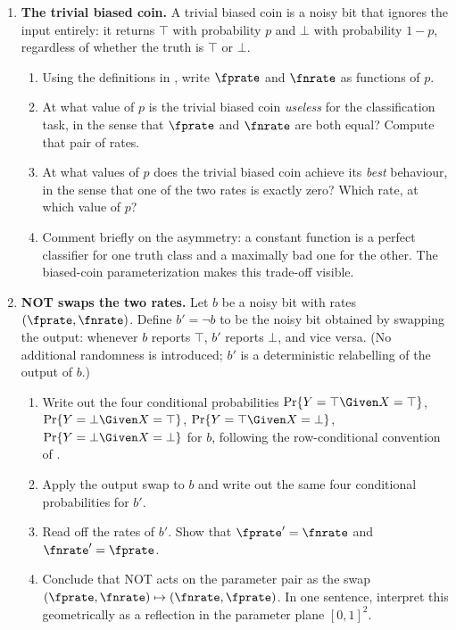 \begin{enumerate}
\item \exstarstar
\label{ex:ch1-5}
\textbf{The trivial biased coin.}
A trivial biased coin is a noisy bit that ignores the input entirely:
it returns $\top$ with probability $p$ and $\bot$ with probability
$1-p$, regardless of whether the truth is $\top$ or $\bot$.
\begin{enumerate}
  \item[(a)] Using the definitions in ,
    write $\fprate$ and $\fnrate$ as functions of $p$.
  \item[(b)] At what value of $p$ is the trivial biased coin
    \emph{useless} for the classification task, in the sense that
    $\fprate$ and $\fnrate$ are both equal? Compute that pair of rates.
  \item[(c)] At what values of $p$ does the trivial biased coin achieve
    its \emph{best} behaviour, in the sense that one of the two rates
    is exactly zero? Which rate, at which value of $p$?
  \item[(d)] Comment briefly on the asymmetry: a constant function is
    a perfect classifier for one truth class and a maximally bad one
    for the other. The biased-coin parameterization makes this trade-off
    visible.
\end{enumerate}

\item \exstarstar
\label{ex:ch1-6}
\textbf{NOT swaps the two rates.}
Let $b$ be a noisy bit with rates $(\fprate, \fnrate)$. Define $b' = \neg
b$ to be the noisy bit obtained by swapping the output: whenever $b$
reports $\top$, $b'$ reports $\bot$, and vice versa. (No additional
randomness is introduced; $b'$ is a deterministic relabelling of the
output of $b$.)
\begin{enumerate}
  \item[(a)] Write out the four conditional probabilities
    $\Pr\{Y = \top \Given X = \top\}$, $\Pr\{Y = \bot \Given X = \top\}$,
    $\Pr\{Y = \top \Given X = \bot\}$, $\Pr\{Y = \bot \Given X = \bot\}$
    for $b$, following the row-conditional convention of
    .
  \item[(b)] Apply the output swap to $b$ and write out the same four
    conditional probabilities for $b'$.
  \item[(c)] Read off the rates of $b'$. Show that $\fprate' = \fnrate$
    and $\fnrate' = \fprate$.
  \item[(d)] Conclude that NOT acts on the parameter pair as the swap
    $(\fprate, \fnrate) \mapsto (\fnrate, \fprate)$. In one sentence,
    interpret this geometrically as a reflection in the parameter plane
    $[0,1]^2$.
\end{enumerate}


\end{enumerate}

